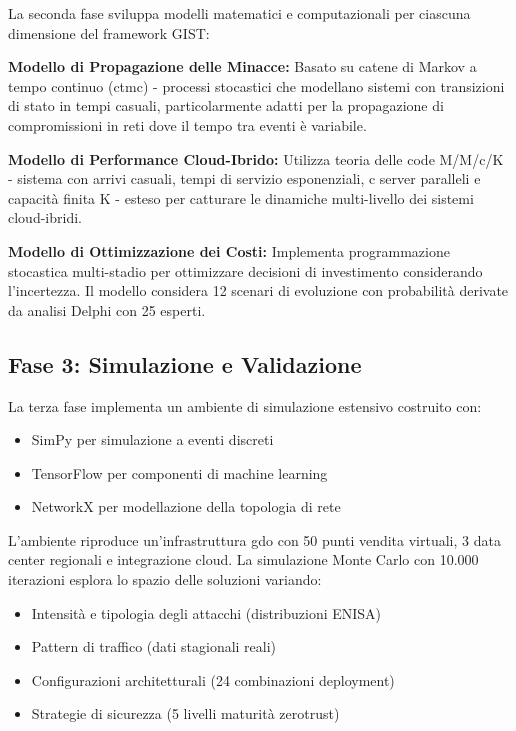 La seconda fase sviluppa modelli matematici e computazionali per ciascuna dimensione del framework GIST:

\textbf{Modello di Propagazione delle Minacce:} Basato su catene di Markov a tempo continuo (\gls{ctmc}) - processi stocastici che modellano sistemi con transizioni di stato in tempi casuali, particolarmente adatti per la propagazione di compromissioni in reti dove il tempo tra eventi è variabile.

\textbf{Modello di Performance Cloud-Ibrido:} Utilizza teoria delle code M/M/c/K - sistema con arrivi casuali, tempi di servizio esponenziali, c server paralleli e capacità finita K - esteso per catturare le dinamiche multi-livello dei sistemi cloud-ibridi.

\textbf{Modello di Ottimizzazione dei Costi:} Implementa programmazione stocastica multi-stadio per ottimizzare decisioni di investimento considerando l'incertezza. Il modello considera 12 scenari di evoluzione con probabilità derivate da analisi Delphi con 25 esperti.

\subsection{\texorpdfstring{\textbf{Fase 3: Simulazione e Validazione}}{1.5.4 - Fase 3: Simulazione e Validazione}}
\label{subsec:fase3}

La terza fase implementa un ambiente di simulazione estensivo costruito con:
\begin{itemize}
\item SimPy per simulazione a eventi discreti
\item TensorFlow per componenti di machine learning
\item NetworkX per modellazione della topologia di rete
\end{itemize}

L'ambiente riproduce un'infrastruttura \gls{gdo} con 50 punti vendita virtuali, 3 data center regionali e integrazione cloud. La simulazione Monte Carlo con 10.000 iterazioni esplora lo spazio delle soluzioni variando:
\begin{itemize}
\item Intensità e tipologia degli attacchi (distribuzioni ENISA)
\item Pattern di traffico (dati stagionali reali)
\item Configurazioni architetturali (24 combinazioni deployment)
\item Strategie di sicurezza (5 livelli maturità \gls{zerotrust})
\end{itemize}

